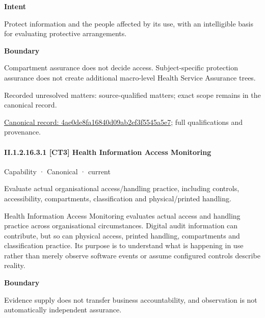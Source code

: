 \textbf{Intent}



Protect information and the people affected by its use, with an intelligible basis for evaluating protective arrangements.



\textbf{Boundary}



Compartment assurance does not decide access. Subject-specific protection assurance does not create additional macro-level Health Service Assurance trees.


{\small Recorded unresolved matters: source-qualified matters; exact scope remains in the canonical record.}\par
{\footnotesize \href{../../../../../../../continuum/strategy/capability/4ae0de8fa16840d09ab2ef3f5545a5e7.md}{Canonical record: 4ae0de8fa16840d09ab2ef3f5545a5e7}; full qualifications and provenance.}\par
\paragraph*{II.1.2.16.3.1 [CT3] Health Information Access Monitoring}
\label{navigation:II.1.2.16.3.1}

\label{element:01854c7311404bbf9f698fce4656b54d}
{\small Capability · Canonical · current}\par

Evaluate actual organisational access/handling practice, including controls, accessibility, compartments, classification and physical/printed handling.



Health Information Access Monitoring evaluates actual access and handling practice across organisational circumstances. Digital audit information can contribute, but so can physical access, printed handling, compartments and classification practice. Its purpose is to understand what is happening in use rather than merely observe software events or assume configured controls describe reality.



\textbf{Boundary}



Evidence supply does not transfer business accountability, and observation is not automatically independent assurance.


